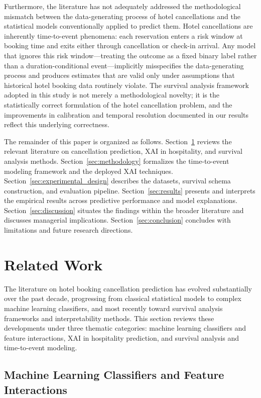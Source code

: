\documentclass[pdflatex,iicol,sn-mathphys-ay]{sn-jnl}
\theoremstyle{thmstyleone}%
\theoremstyle{thmstyletwo}%
\theoremstyle{thmstylethree}%
\begin{document}
Furthermore, the literature has not adequately addressed the methodological mismatch between the data-generating process of hotel cancellations and the statistical models conventionally applied to predict them. Hotel cancellations are inherently time-to-event phenomena: each reservation enters a risk window at booking time and exits either through cancellation or check-in arrival. Any model that ignores this risk window—treating the outcome as a fixed binary label rather than a duration-conditional event—implicitly misspecifies the data-generating process and produces estimates that are valid only under assumptions that historical hotel booking data routinely violate. The survival analysis framework adopted in this study is not merely a methodological novelty; it is the statistically correct formulation of the hotel cancellation problem, and the improvements in calibration and temporal resolution documented in our results reflect this underlying correctness.

The remainder of this paper is organized as follows. Section~\ref{sec:related_work} reviews the relevant literature on cancellation prediction, XAI in hospitality, and survival analysis methods. Section~\ref{sec:methodology} formalizes the time-to-event modeling framework and the deployed XAI techniques. Section~\ref{sec:experimental_design} describes the datasets, survival schema construction, and evaluation pipeline. Section~\ref{sec:results} presents and interprets the empirical results across predictive performance and model explanations. Section~\ref{sec:discussion} situates the findings within the broader literature and discusses managerial implications. Section~\ref{sec:conclusion} concludes with limitations and future research directions.

\section{Related Work}
\label{sec:related_work}

The literature on hotel booking cancellation prediction has evolved substantially over the past decade, progressing from classical statistical models to complex machine learning classifiers, and most recently toward survival analysis frameworks and interpretability methods. This section reviews these developments under three thematic categories: machine learning classifiers and feature interactions, XAI in hospitality prediction, and survival analysis and time-to-event modeling.

\subsection{Machine Learning Classifiers and Feature Interactions}
\end{document}
